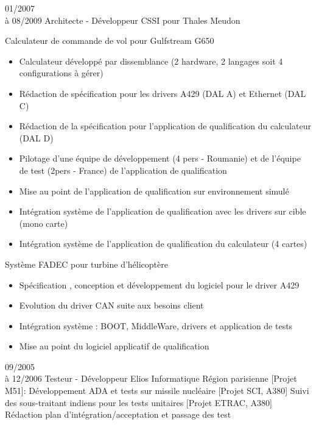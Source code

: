 \documentclass[10pt,a4paper]{moderncv}       %
\begin{document}
\cventry
{01/2007\\à 08/2009}       %
{Architecte - Développeur} %
{CSSI pour Thales}        %
{Meudon}                   %
{}                         %
{
Calculateur de commande de vol pour Gulfstream G650
\begin{itemize}
  \item Calculateur développé par dissemblance (2 hardware, 2 langages soit 4 configurations à gérer)
  \item Rédaction de spécification pour les drivers A429 (DAL A) et Ethernet
  (DAL C)
  \item Rédaction de la spécification pour l'application de qualification du
  calculateur (DAL D)
  \item Pilotage d'une équipe de développement (4 pers - Roumanie)
  et de l'équipe de test (2pers - France) de
  l'application de qualification
  \item Mise au point de l'application de qualification sur environnement simulé
  \item Intégration système de l'application de qualification avec les drivers
  sur cible (mono carte)
  \item Intégration système de l'application de qualification du calculateur (4 cartes)
\end{itemize}
Système FADEC pour turbine d'hélicoptère
\begin{itemize}
  \item Spécification , conception et développement du logiciel pour le driver
  A429
  \item Evolution du driver CAN suite aux besoins client
  \item Intégration système : BOOT, MiddleWare, drivers et application de tests
  \item Mise au point du logiciel applicatif de qualification
\end{itemize}
\newline{}}
\cventry
{09/2005\\à 12/2006}    %
{Testeur - Développeur} %
{Elios Informatique}    %
{Région parisienne}     %
{}                      %
{
[Projet M51]: Développement ADA et tests sur missile nucléaire
\newline{}
[Projet SCI, A380] Suivi des sous-traitant indiens pour les tests unitaires
\newline{}
[Projet ETRAC, A380] Rédaction plan d’intégration/acceptation et passage
  des test
\newline{}}
\end{document}
